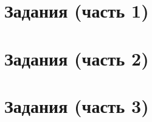 \begin{ESKDtitlePage}
    \tableofcontents 
    \newpage
\end{ESKDtitlePage}








\section{Задания (часть 1)}
    
    
    
    
    
    
    
    \newpage


\section{Задания (часть 2)}
    
    
    
    
    \newpage

    
\section{Задания (часть 3)}
    
    
    
    
    
    
    
    
    
    \newpage

